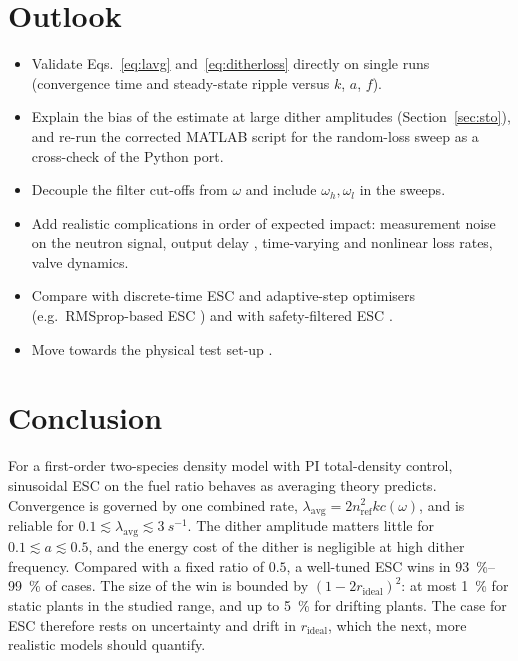 \documentclass[11pt,a4paper]{article}
\newcommand{\nref}{n_\mathrm{ref}}
\newcommand{\rid}{r_\mathrm{ideal}}
\newcommand{\lavg}{\lambda_\mathrm{avg}}
\begin{document}
\section{Outlook}
\label{sec:outlook}
\begin{itemize}
  \item Validate Eqs.~\eqref{eq:lavg} and~\eqref{eq:ditherloss} directly on single runs (convergence time and steady-state ripple versus $k$, $a$, $f$).
  \item Explain the bias of the estimate at large dither amplitudes (Section~\ref{sec:sto}), and re-run the corrected MATLAB script for the random-loss sweep as a cross-check of the Python port.
  \item Decouple the filter cut-offs from $\omega$ and include $\omega_h,\omega_l$ in the sweeps.
  \item Add realistic complications in order of expected impact: measurement noise on the neutron signal, output delay \citep{santos2020delays}, time-varying and nonlinear loss rates, valve dynamics.
  \item Compare with discrete-time ESC and adaptive-step optimisers (e.g.\ RMSprop-based ESC \citep{mcnamee_rmsprop_esc}) and with safety-filtered ESC \citep{williams2025safety}.
  \item Move towards the physical test set-up \citep{varnavides2025setup,dekorte2026esc}.
\end{itemize}

\section{Conclusion}
For a first-order two-species density model with PI total-density control, sinusoidal ESC on the fuel ratio behaves as averaging theory predicts. Convergence is governed by one combined rate, $\lavg=2\nref^2kc(\omega)$, and is reliable for $0.1\lesssim\lavg\lesssim\SI{3}{s^{-1}}$. The dither amplitude matters little for $0.1\lesssim a\lesssim0.5$, and the energy cost of the dither is negligible at high dither frequency.
Compared with a fixed ratio of $0.5$, a well-tuned ESC wins in \SIrange{93}{99}{\percent} of cases. The size of the win is bounded by $(1-2\rid)^2$: at most \SI{1}{\percent} for static plants in the studied range, and up to \SI{5}{\percent} for drifting plants. The case for ESC therefore rests on uncertainty and drift in $\rid$, which the next, more realistic models should quantify.



\end{document}
